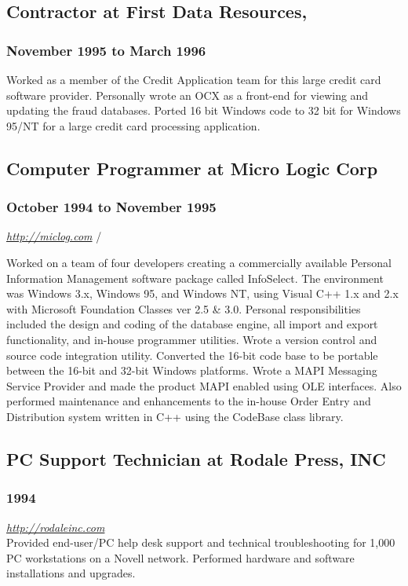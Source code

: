 \documentclass[letterpaper]{article}
\begin{document}
\subsection{Contractor at First Data Resources,}
\label{sec-2-8}
\subsubsection{November 1995 to March 1996}
\label{sec-2-8-1}
\vspace{0.1in}

Worked as a member of the Credit Application team for this large
credit card software provider. Personally wrote an OCX as a front-end
for viewing and updating the fraud databases. Ported 16 bit Windows
code to 32 bit for Windows 95/NT for a large credit card processing
application.

\subsection{Computer Programmer at Micro Logic Corp}
\label{sec-2-9}
\subsubsection{October 1994 to November 1995}
\label{sec-2-9-1}
\emph{\url{http://miclog.com}} /\\
\vspace{0.1in}

Worked on a team of four developers creating a commercially available
Personal Information Management software package called
InfoSelect. The environment was Windows 3.x, Windows 95, and Windows
NT, using Visual C++ 1.x and 2.x with Microsoft Foundation Classes ver
2.5 \& 3.0. Personal responsibilities included the design and coding of
the database engine, all import and export functionality, and in-house
programmer utilities. Wrote a version control and source code
integration utility. Converted the 16-bit code base to be portable
between the 16-bit and 32-bit Windows platforms. Wrote a MAPI
Messaging Service Provider and made the product MAPI enabled using OLE
interfaces. Also performed maintenance and enhancements to the
in-house Order Entry and Distribution system written in C++ using the
CodeBase class library.

\subsection{PC Support Technician at Rodale Press, INC}
\label{sec-2-10}
\subsubsection{1994}
\label{sec-2-10-1}
\emph{\url{http://rodaleinc.com}}\\
\vspace{0.1in}
Provided end-user/PC help desk support and technical troubleshooting
for 1,000 PC workstations on a Novell network. Performed hardware and
software installations and upgrades.
\end{document}
